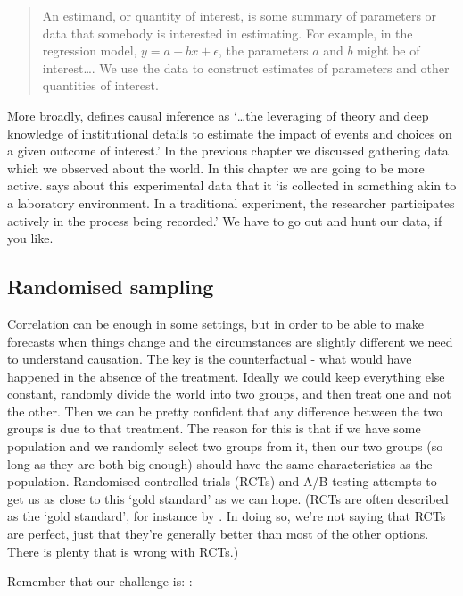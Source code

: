 \documentclass[
]{book}
\begin{document}
\begin{quote}
An estimand, or quantity of interest, is some summary of parameters or data that somebody is interested in estimating. For example, in the regression model, \(y = a + bx + \epsilon\), the parameters \(a\) and \(b\) might be of interest\ldots. We use the data to construct estimates of parameters and other quantities of interest.
\end{quote}

More broadly, \citet{Cunningham2021} defines causal inference as `\ldots the leveraging of theory and deep knowledge of institutional details to estimate the impact of events and choices on a given outcome of interest.' In the previous chapter we discussed gathering data which we observed about the world. In this chapter we are going to be more active. \citet{Cunningham2021} says about this experimental data that it `is collected in something akin to a laboratory environment. In a traditional experiment, the researcher participates actively in the process being recorded.' We have to go out and hunt our data, if you like.

\hypertarget{randomised-sampling}{%
\subsection{Randomised sampling}\label{randomised-sampling}}

Correlation can be enough in some settings, but in order to be able to make forecasts when things change and the circumstances are slightly different we need to understand causation. The key is the counterfactual - what would have happened in the absence of the treatment. Ideally we could keep everything else constant, randomly divide the world into two groups, and then treat one and not the other. Then we can be pretty confident that any difference between the two groups is due to that treatment. The reason for this is that if we have some population and we randomly select two groups from it, then our two groups (so long as they are both big enough) should have the same characteristics as the population. Randomised controlled trials (RCTs) and A/B testing attempts to get us as close to this `gold standard' as we can hope. (RCTs are often described as the `gold standard', for instance by \citet{athey2017state}. In doing so, we're not saying that RCTs are perfect, just that they're generally better than most of the other options. There is plenty that is wrong with RCTs.)

Remember that our challenge is: \citep[p.51-52]{gertler2016impact}:
\end{document}
